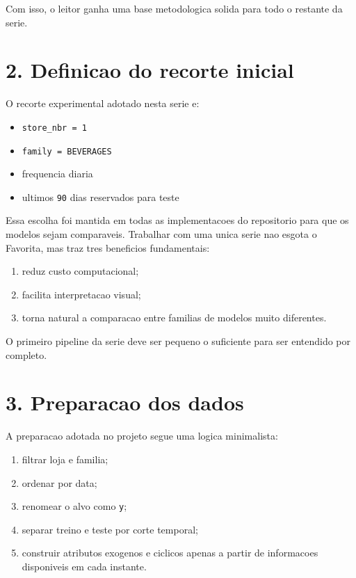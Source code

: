 \documentclass[12pt]{article}
\providecommand{\tightlist}{%
  \setlength{\itemsep}{0pt}\setlength{\parskip}{0pt}}
\begin{document}
Com isso, o leitor ganha uma base metodologica solida para todo o restante da serie.

\section{2. Definicao do recorte inicial}\label{2-definicao-do-recorte-inicial}

O recorte experimental adotado nesta serie e:

\begin{itemize}
\tightlist
\item
  \texttt{store\_nbr\ =\ 1}
\item
  \texttt{family\ =\ BEVERAGES}
\item
  frequencia diaria
\item
  ultimos \texttt{90} dias reservados para teste
\end{itemize}

Essa escolha foi mantida em todas as implementacoes do repositorio para que os modelos sejam comparaveis. Trabalhar com uma unica serie nao esgota o Favorita, mas traz tres beneficios fundamentais:

\begin{enumerate}
\def\labelenumi{\arabic{enumi}.}
\tightlist
\item
  reduz custo computacional;
\item
  facilita interpretacao visual;
\item
  torna natural a comparacao entre familias de modelos muito diferentes.
\end{enumerate}

O primeiro pipeline da serie deve ser pequeno o suficiente para ser entendido por completo.

\section{3. Preparacao dos dados}\label{3-preparacao-dos-dados}

A preparacao adotada no projeto segue uma logica minimalista:

\begin{enumerate}
\def\labelenumi{\arabic{enumi}.}
\tightlist
\item
  filtrar loja e familia;
\item
  ordenar por data;
\item
  renomear o alvo como \texttt{y};
\item
  separar treino e teste por corte temporal;
\item
  construir atributos exogenos e ciclicos apenas a partir de informacoes disponiveis em cada instante.
\end{enumerate}
\end{document}
